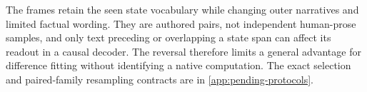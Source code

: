 The frames retain the seen state vocabulary while changing outer narratives and limited factual wording. They are authored pairs, not independent human-prose samples, and only text preceding or overlapping a state span can affect its readout in a causal decoder. The reversal therefore limits a general advantage for difference fitting without identifying a native computation. The exact selection and paired-family resampling contracts are in \cref{app:pending-protocols}.

